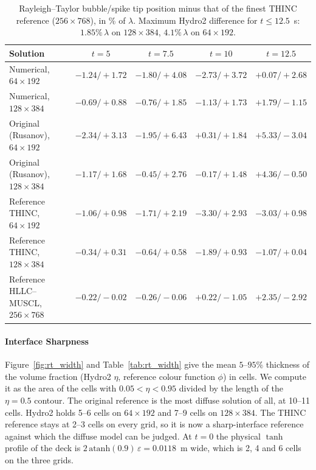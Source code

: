 \begin{table}[H]
    \centering
    \caption{Rayleigh--Taylor bubble/spike tip position minus that of the finest THINC reference ($256\times768$), in \% of $\lambda$. Maximum Hydro2 difference for $t\le12.5$~s: $1.85\%\,\lambda$ on $128\times384$, $4.1\%\,\lambda$ on $64\times192$.}
    \label{tab:rt_tips}
    \begin{tabular}{l c c c c}
        \hline
        Solution & $t = 5$ & $t = 7.5$ & $t = 10$ & $t = 12.5$ \\
        \hline
        Numerical, $64\times192$                 & $-1.24/+1.72$ & $-1.80/+4.08$ & $-2.73/+3.72$ & $+0.07/+2.68$ \\
        Numerical, $128\times384$                & $-0.69/+0.88$ & $-0.76/+1.85$ & $-1.13/+1.73$ & $+1.79/-1.15$ \\
        Original (Rusanov), $64\times192$        & $-2.34/+3.13$ & $-1.95/+6.43$ & $+0.31/+1.84$ & $+5.33/-3.04$ \\
        Original (Rusanov), $128\times384$       & $-1.17/+1.68$ & $-0.45/+2.76$ & $-0.17/+1.48$ & $+4.36/-0.50$ \\
        Reference THINC, $64\times192$           & $-1.06/+0.98$ & $-1.71/+2.19$ & $-3.30/+2.93$ & $-3.03/+0.98$ \\
        Reference THINC, $128\times384$          & $-0.34/+0.31$ & $-0.64/+0.58$ & $-1.89/+0.93$ & $-1.07/+0.04$ \\
        Reference HLLC--MUSCL, $256\times768$    & $-0.22/-0.02$ & $-0.26/-0.06$ & $+0.22/-1.05$ & $+2.35/-2.92$ \\
        \hline
    \end{tabular}
\end{table}

\paragraph{Interface Sharpness}
Figure~\ref{fig:rt_width} and Table~\ref{tab:rt_width} give the mean $5$--$95\%$ thickness of the volume fraction (Hydro2 $\eta$, reference colour function $\phi$) in cells. We compute it as the area of the cells with $0.05 < \eta < 0.95$ divided by the length of the $\eta = 0.5$ contour. The original reference is the most diffuse solution of all, at 10--11 cells. Hydro2 holds 5--6 cells on $64\times192$ and 7--9 cells on $128\times384$. The THINC reference stays at 2--3 cells on every grid, so it is now a sharp-interface reference against which the diffuse model can be judged. At $t = 0$ the physical $\tanh$ profile of the deck is $2\,\mathrm{atanh}(0.9)\,\varepsilon = 0.0118$~m wide, which is 2, 4 and 6 cells on the three grids.

